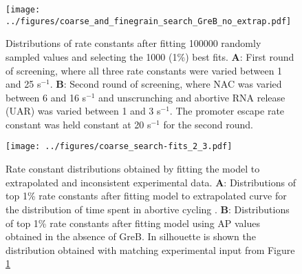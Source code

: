 \begin{figure}
	\begin{center}
      \texttt{[image: ../figures/coarse\_and\_finegrain\_search\_GreB\_no\_extrap.pdf]}
	\end{center}
    \caption{Distributions of rate constants after fitting 100000 randomly
      sampled values and selecting the 1000 (1\%) best fits. \textbf{A}: First round
      of screening, where all three rate constants were varied between 1 and
      25 s$^{-1}$. \textbf{B}: Second round of screening, where NAC was varied
      between 6 and 16 s$^{-1}$ and unscrunching and abortive RNA release
      (UAR) was varied between 1 and 3 s$^{-1}$. The promoter escape rate
      constant was held constant at 20 s$^{-1}$ for the second round.}
      \label{fig:parameter_estimation_proper}
\end{figure}

\begin{figure}
	\begin{center}
      \texttt{[image: ../figures/coarse\_search-fits\_2\_3.pdf]}
	\end{center}
    \caption{
      Rate constant distributions obtained by fitting the model to
      extrapolated and inconsistent experimental data. \textbf{A}:
      Distributions of top 1\% rate constants after fitting model to
      extrapolated curve for the distribution of time spent in abortive
      cycling \cite{revyakin_abortive_2006}. \textbf{B}: Distributions of top
      1\% rate constants after fitting model using AP values obtained in the
      absence of GreB. In silhouette is shown the distribution obtained with
      matching experimental input from Figure \ref{fig:parameter_estimation_proper}}
      \label{fig:extrap_and_GreB_minus_fit}
\end{figure}

